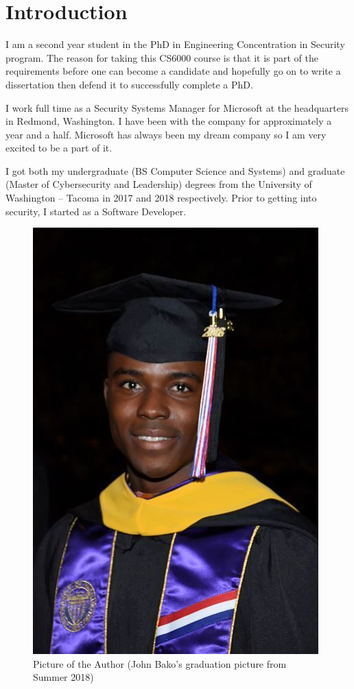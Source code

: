 \section{\large \bf Introduction}

I am a second year student in the PhD in Engineering \– Concentration in Security program. The reason for taking this CS6000 course is that it is part of the requirements before one can become a candidate and hopefully go on to write a dissertation then defend it to successfully complete a PhD.

I work full time as a Security Systems Manager for Microsoft at the headquarters in Redmond, Washington. I have been with the company for approximately a year and a half. Microsoft has always been my dream company so I am very excited to be a part of it.

I got both my undergraduate (BS Computer Science and Systems) and graduate (Master of Cybersecurity and Leadership) degrees from the University of Washington – Tacoma in 2017 and 2018 respectively. Prior to getting into security, I started as a Software Developer.

\begin{figure}
  \includegraphics[width=\linewidth]{jbako.jpg}
  \caption{Picture of the Author (John Bako's graduation picture from Summer 2018)}
\end{figure}

